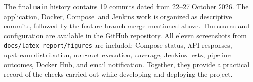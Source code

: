 \documentclass[9pt,a4paper]{article}
\begin{document}
The final \texttt{main} history contains 19 commits dated from 22--27
October 2026. The application, Docker, Compose, and Jenkins work is organized
as descriptive commits, followed by the feature-branch merge mentioned above.
The source and configuration are available in the
\href{https://github.com/vaishak-iiitb/calc_spe}{GitHub repository}. All
eleven screenshots from \texttt{docs/latex\_report/figures} are included:
Compose status, API responses, upstream distribution, non-root execution,
coverage, Jenkins tests, pipeline outcomes, Docker Hub, and email
notification. Together, they provide a practical record of the checks carried
out while developing and deploying the project.
\end{document}
